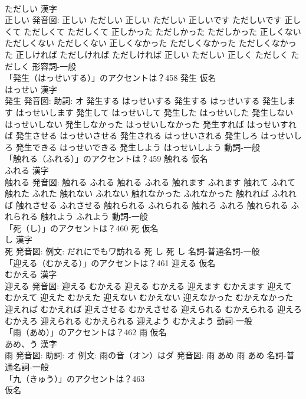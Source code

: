 \documentclass[8pt]{extreport}
\begin{document}
\begin{CJK}{UTF8}{min}
\\	ただしい 漢字　
\\	正しい 発音図:	正しい ただしい		正しい ただしい 正しいです ただしいです 正しくて ただしくて ただしくて 正しかった ただしかった ただしかった 正しくない ただしくない ただしくない 正しくなかった ただしくなかった ただしくなかった 正しければ ただしければ ただしければ 正しい ただしい 正しく ただしく ただしく				形容詞-一般 
\\	「発生（はっせいする）」のアクセントは？458	発生 仮名　
\\	はっせい 漢字　
\\	発生 発音図: 助詞: オ	発生する はっせいする		発生する はっせいする 発生します はっせいします 発生して はっせいして 発生した はっせいした 発生しない はっせいしない 発生しなかった はっせいしなかった 発生すれば はっせいすれば 発生させる はっせいさせる 発生される はっせいされる 発生しろ はっせいしろ 発生できる はっせいできる 発生しよう はっせいしよう				動詞-一般 
\\	「触れる（ふれる）」のアクセントは？459	触れる 仮名　
\\	ふれる 漢字　
\\	触れる 発音図:	触れる ふれる		触れる ふれる 触れます ふれます 触れて ふれて 触れた ふれた 触れない ふれない 触れなかった ふれなかった 触れれば ふれれば 触れさせる ふれさせる 触れられる ふれられる 触れろ ふれろ 触れられる ふれられる 触れよう ふれよう				動詞-一般 
\\	「死（し）」のアクセントは？460	死 仮名　
\\	し 漢字　
\\	死 発音図: 例文: だれにでもワ訪れる	死 し		死 し				名詞-普通名詞-一般 
\\	「迎える（むかえる）」のアクセントは？461	迎える 仮名　
\\	むかえる 漢字　
\\	迎える 発音図:	迎える むかえる		迎える むかえる 迎えます むかえます 迎えて むかえて 迎えた むかえた 迎えない むかえない 迎えなかった むかえなかった 迎えれば むかえれば 迎えさせる むかえさせる 迎えられる むかえられる 迎えろ むかえろ 迎えられる むかえられる 迎えよう むかえよう				動詞-一般 
\\	「雨（あめ）」のアクセントは？462	雨 仮名　
\\	あめ、う 漢字　
\\	雨 発音図: 助詞: オ 例文: 雨の音（オン）はダ 発音図:	雨 あめ		雨 あめ				名詞-普通名詞-一般 
\\	「九（きゅう）」のアクセントは？463	
\\	仮名　

\end{CJK}
\end{document}
